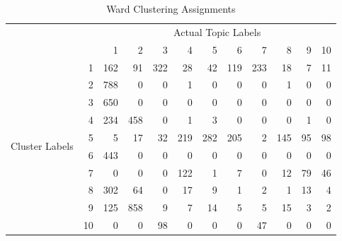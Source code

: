 \documentclass[11pt]{article}
\begin{document}
\begin{table}[htbp]
  \centering
  \caption{Ward Clustering Assignments}
    \begin{tabular}{rr|r|r|r|r|r|r|r|r|r|r}
    \toprule
          &       & \multicolumn{10}{c}{Actual Topic Labels} \\
             &       & 1     & 2     & 3     & 4     & 5     & 6     & 7     & 8     & 9     & 10 \\
    \midrule \multicolumn{1}{c}{\multirow{10}[5]{*}{Cluster Labels}} & 1     & 162   & 91    & 322   & 28    & 42    & 119   & 233   & 18    & 7     & 11 \\
    \multicolumn{1}{c}{} & 2     & 788   & 0     & 0     & 1     & 0     & 0     & 0     & 1     & 0     & 0 \\
    \multicolumn{1}{c}{} & 3     & 650   & 0     & 0     & 0     & 0     & 0     & 0     & 0     & 0     & 0 \\
    \multicolumn{1}{c}{} & 4     & 234   & 458   & 0     & 1     & 3     & 0     & 0     & 0     & 1     & 0 \\
    \multicolumn{1}{c}{} & 5     & 5     & 17    & 32    & 219   & 282   & 205   & 2     & 145   & 95    & 98 \\
    \multicolumn{1}{c}{} & 6     & 443   & 0     & 0     & 0     & 0     & 0     & 0     & 0     & 0     & 0 \\
    \multicolumn{1}{c}{} & 7     & 0     & 0     & 0     & 122   & 1     & 7     & 0     & 12    & 79    & 46 \\
    \multicolumn{1}{c}{} & 8     & 302   & 64    & 0     & 17    & 9     & 1     & 2     & 1     & 13    & 4 \\
    \multicolumn{1}{c}{} & 9     & 125   & 858   & 9     & 7     & 14    & 5     & 5     & 15    & 3     & 2 \\
    \multicolumn{1}{c}{} & 10    & 0     & 0     & 98    & 0     & 0     & 0     & 47    & 0     & 0     & 0 \\
    \bottomrule
    \end{tabular}%
  \label{tab:ward}%
\end{table}%
\end{document}
